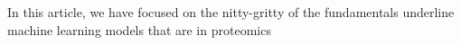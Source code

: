 In this article, we have focused on the nitty-gritty of the fundamentals underline machine learning models that are in proteomics